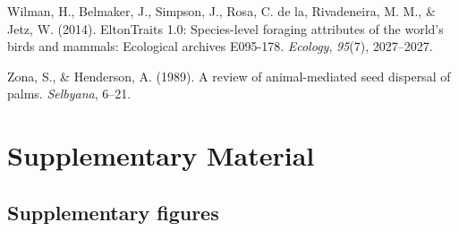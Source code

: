 \documentclass[
]{agujournal2019}
\newlength{\cslhangindent}
\newenvironment{CSLReferences}[2] %
 {\begin{list}{}{%
  \setlength{\itemindent}{0pt}
  \setlength{\leftmargin}{0pt}
  \setlength{\parsep}{0pt}
  \ifodd #1
   \setlength{\leftmargin}{\cslhangindent}
   \setlength{\itemindent}{-1\cslhangindent}
  \fi
  \setlength{\itemsep}{#2\baselineskip}}}
 {\end{list}}
\begin{document}
\begin{CSLReferences}{1}{0}
Wilman, H., Belmaker, J., Simpson, J., Rosa, C. de la, Rivadeneira, M.
M., \& Jetz, W. (2014). EltonTraits 1.0: Species-level foraging
attributes of the world's birds and mammals: Ecological archives
E095-178. \emph{Ecology}, \emph{95}(7), 2027--2027.

Zona, S., \& Henderson, A. (1989). A review of animal-mediated seed
dispersal of palms. \emph{Selbyana}, 6--21.

\end{CSLReferences}

\section{Supplementary Material}\label{supplementary-material}

\subsection{Supplementary figures}\label{supplementary-figures}
\end{document}
